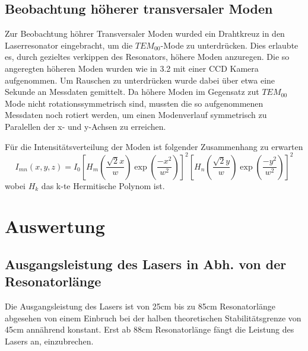 \documentclass[bigchapter,colorback,accentcolor=tud4b,linedtoc,11pt]{tudreport}
\numberwithin{equation}{subsection}
\begin{document}
\section{Beobachtung höherer transversaler Moden}
Zur Beobachtung höhrer Transversaler Moden wurded ein Drahtkreuz in den Laserresonator eingebracht, um die $TEM_{00}$-Mode zu unterdrücken. Dies erlaubte es, durch gezieltes verkippen des Resonators, höhere Moden anzuregen. Die so angeregten höheren Moden wurden wie in 3.2 mit einer CCD Kamera aufgenommen. Um Rauschen zu unterdrücken wurde dabei über etwa eine Sekunde an Messdaten gemittelt. Da höhere Moden im Gegensatz zut $TEM_{00}$ Mode nicht rotationssymmetrisch sind, mussten die so aufgenommenen Messdaten noch rotiert werden, um einen Modenverlauf symmetrisch zu Paralellen der x- und y-Achsen zu erreichen.

Für die Intensitätsverteilung der Moden ist folgender Zusammenhang zu erwarten
$$I_{mn}(x, y, z) = I_0 \left[ H_m \left( \frac{ \sqrt{2} x}{w} \right) \exp \left( \frac{-x^2}{w^2} \right) \right]^2 \left[ H_n \left( \frac{ \sqrt{2} y}{w} \right) \exp \left( \frac{-y^2}{w^2} \right) \right]^2$$
\cite{TransModeIntensity}
wobei $H_k$ das k-te Hermitische Polynom ist.

\chapter{Auswertung}
\section{Ausgangsleistung des Lasers in Abh. von der Resonatorlänge}
Die Ausgangsleistung des Lasers ist von 25cm bis zu 85cm Resonatorlänge abgesehen von einem Einbruch bei der halben theoretischen Stabilitätsgrenze von 45cm annährend konstant. Erst ab 88cm Resonatorlänge fängt die Leistung des Lasers an, einzubrechen.
\end{document}
